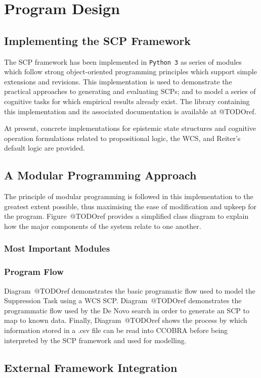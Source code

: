 \chapter{Program Design} \label{chp:program}
\section{Implementing the SCP Framework}
The SCP framework has been implemented in \texttt{Python 3} as series of modules which follow strong object-oriented programming principles which support simple extensions and revisions. This implementation is used to demonstrate the practical approaches to generating and evaluating SCPs; and to model a series of cognitive tasks for which empirical results already exist. The library containing this implementation and its associated documentation is available at @TODOref.

At present, concrete implementations for epistemic state structures and cognitive operation formulations related to propositional logic, the WCS, and Reiter's default logic are provided.

\section{A Modular Programming Approach}
The principle of modular programming is followed in this implementation to the greatest extent possible, thus maximising the ease of modification and upkeep for the program. Figure~@TODOref provides a simplified class diagram to explain how the major components of the system relate to one another.

\subsection{Most Important Modules}

\subsection{Program Flow}
Diagram~@TODOref demonstrates the basic programatic flow used to model the Suppression Task using a WCS SCP. Diagram~@TODOref demonstrates the programmatic flow used by the De Novo search in order to generate an SCP to map to known data. Finally, Diagram~@TODOref shows the process by which information stored in a .csv file can be read into CCOBRA before being interpreted by the SCP framework and used for modelling.

\section{External Framework Integration}

